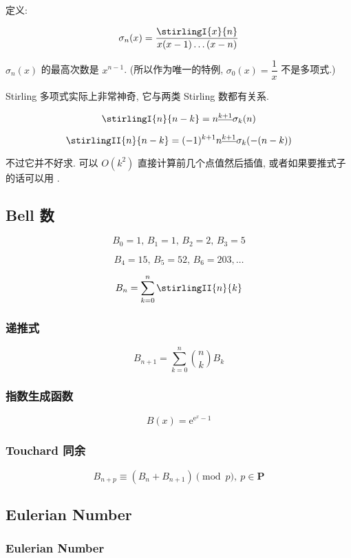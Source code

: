 定义:

\[
    \sigma_n(x) = \frac{\stirlingI{x}{n}}{x(x-1)\dots(x-n)}
\]

\(\sigma_n(x)\) 的最高次数是 \(x^{n - 1}\). (所以作为唯一的特例, \(\sigma_0(x) = \dfrac{1}{x}\) 不是多项式.)

Stirling 多项式实际上非常神奇, 它与两类 Stirling 数都有关系.

\[
    \stirlingI{n}{n-k} = n^{\underline{k+1}} \sigma_k(n)
\]

\[
    \stirlingII{n}{n-k} = (-1)^{k+1} n^{\underline{k+1}} \sigma_k(-(n-k))
\]

不过它并不好求. 可以 \(O(k^2)\) 直接计算前几个点值然后插值, 或者如果要推式子的话可以用 .

\subsection{Bell 数}
\label{sec:bell-数}

\[
    B_0 = 1,\, B_1 = 1,\, B_2 = 2,\, B_3 = 5
\]

\[
    B_4 = 15,\, B_5 = 52,\, B_6 = 203, \dots
\]

\[
    B_n = \sum_{k = 0} ^ n \stirlingII{n}{k}
\]

\subsubsection{递推式}

\[
    B_{n + 1} = \sum_{k = 0} ^n \binom{n}{k} B_k
\]

\subsubsection{指数生成函数}

\[
    B(x) = \mathrm{e}^{\mathrm{e}^x - 1}
\]

\subsubsection{Touchard 同余}

\[
    B_{n + p} \equiv (B_n + B_{n + 1}) \pmod p,~p\in\mathbf{P}
\]

\subsection{Eulerian Number}
\label{sec:eulerian-number}

\subsubsection{Eulerian Number}
\label{ssec:eulerian-number}


